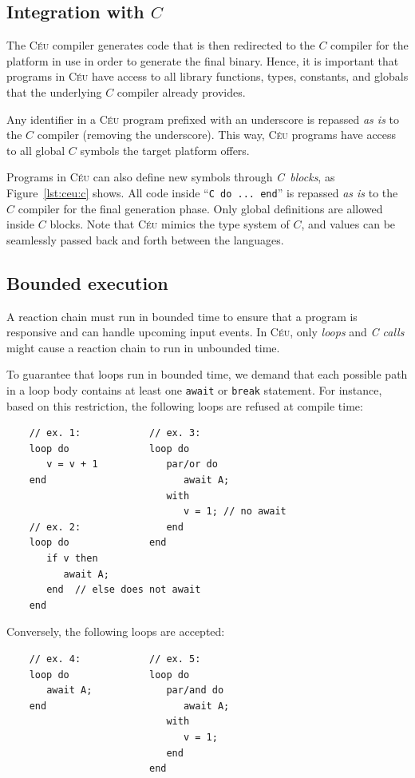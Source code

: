 \documentclass{sigplan-proc}
\newcommand{\2}{\;\;}
\newcommand{\5}{\;\;\;\;\;}
\newcommand{\CEU}{\textsc{C\'{e}u}}
\newcommand{\code}[1] {{\small{\texttt{#1}}}}
\begin{document}
\subsection{Integration with $C$}
\label{sec:ceu:c}

The \CEU{} compiler generates code that is then redirected to the $C$ compiler 
for the platform in use in order to generate the final binary.
Hence, it is important that programs in \CEU{} have access to all library 
functions, types, constants, and globals that the underlying $C$ compiler 
already provides.

Any identifier in a \CEU{} program prefixed with an underscore is repassed 
\emph{as is} to the $C$ compiler (removing the underscore).
This way, \CEU{} programs have access to all global $C$ symbols the target 
platform offers.

Programs in \CEU{} can also define new symbols through \emph{C~blocks}, as 
Figure~\ref{lst:ceu:c} shows.
All code inside ``\code{C do ... end}'' is repassed \emph{as is} to the $C$ 
compiler for the final generation phase.
Only global definitions are allowed inside $C$ blocks.
Note that \CEU{} mimics the type system of $C$, and values can be seamlessly 
passed back and forth between the languages.

\subsection{Bounded execution}
\label{sec:ceu:bounded}

A reaction chain must run in bounded time to ensure that a program is 
responsive and can handle upcoming input events.
In \CEU, only \emph{loops} and \emph{C calls} might cause a reaction chain to 
run in unbounded time.

To guarantee that loops run in bounded time, we demand that each possible path 
in a loop body contains at least one \code{await} or \code{break} statement.
For instance, based on this restriction, the following loops are refused at 
compile time:

{\small
\begin{verbatim}
    // ex. 1:            // ex. 3:
    loop do              loop do
       v = v + 1            par/or do
    end                        await A;
                            with
                               v = 1; // no await
    // ex. 2:               end
    loop do              end
       if v then
          await A;
       end  // else does not await
    end
\end{verbatim}
}
Conversely, the following loops are accepted:
{\small
\begin{verbatim}
    // ex. 4:            // ex. 5:
    loop do              loop do
       await A;             par/and do
    end                        await A;
                            with
                               v = 1;
                            end
                         end
\end{verbatim}
}
\end{document}
